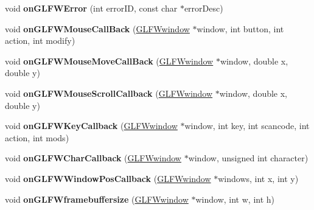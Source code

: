 \begin{DoxyCompactItemize}
void {\bfseries on\+G\+L\+F\+W\+Error} (int error\+ID, const char $\ast$error\+Desc)
\item 
\mbox{\label{classGLViewImpl_af027af43c0b1432110689b352aa521e1}} 
void {\bfseries on\+G\+L\+F\+W\+Mouse\+Call\+Back} (\hyperlink{group__window_ga3c96d80d363e67d13a41b5d1821f3242}{G\+L\+F\+Wwindow} $\ast$window, int button, int action, int modify)
\item 
\mbox{\label{classGLViewImpl_a509ab080c7593b004876c7e3eef1ec88}} 
void {\bfseries on\+G\+L\+F\+W\+Mouse\+Move\+Call\+Back} (\hyperlink{group__window_ga3c96d80d363e67d13a41b5d1821f3242}{G\+L\+F\+Wwindow} $\ast$window, double x, double y)
\item 
\mbox{\label{classGLViewImpl_afa18e1ffd59d59d94f8d97b5552767dc}} 
void {\bfseries on\+G\+L\+F\+W\+Mouse\+Scroll\+Callback} (\hyperlink{group__window_ga3c96d80d363e67d13a41b5d1821f3242}{G\+L\+F\+Wwindow} $\ast$window, double x, double y)
\item 
\mbox{\label{classGLViewImpl_a82c0895fe2f0b245e2273cc41e6019b4}} 
void {\bfseries on\+G\+L\+F\+W\+Key\+Callback} (\hyperlink{group__window_ga3c96d80d363e67d13a41b5d1821f3242}{G\+L\+F\+Wwindow} $\ast$window, int key, int scancode, int action, int mods)
\item 
\mbox{\label{classGLViewImpl_a257794d0cb81e4aa486e58b79e012ac3}} 
void {\bfseries on\+G\+L\+F\+W\+Char\+Callback} (\hyperlink{group__window_ga3c96d80d363e67d13a41b5d1821f3242}{G\+L\+F\+Wwindow} $\ast$window, unsigned int character)
\item 
\mbox{\label{classGLViewImpl_aa6e838ce1067abc29d0b7adc8a21d0a4}} 
void {\bfseries on\+G\+L\+F\+W\+Window\+Pos\+Callback} (\hyperlink{group__window_ga3c96d80d363e67d13a41b5d1821f3242}{G\+L\+F\+Wwindow} $\ast$windows, int x, int y)
\item 
\mbox{\label{classGLViewImpl_af23c5c26aaf15d7929c08c562d8cd875}} 
void {\bfseries on\+G\+L\+F\+Wframebuffersize} (\hyperlink{group__window_ga3c96d80d363e67d13a41b5d1821f3242}{G\+L\+F\+Wwindow} $\ast$window, int w, int h)
\item 
\mbox{\label{classGLViewImpl_a1e45eb1b8b4383de1198619034a8fcd6}} 

\end{DoxyCompactItemize}
